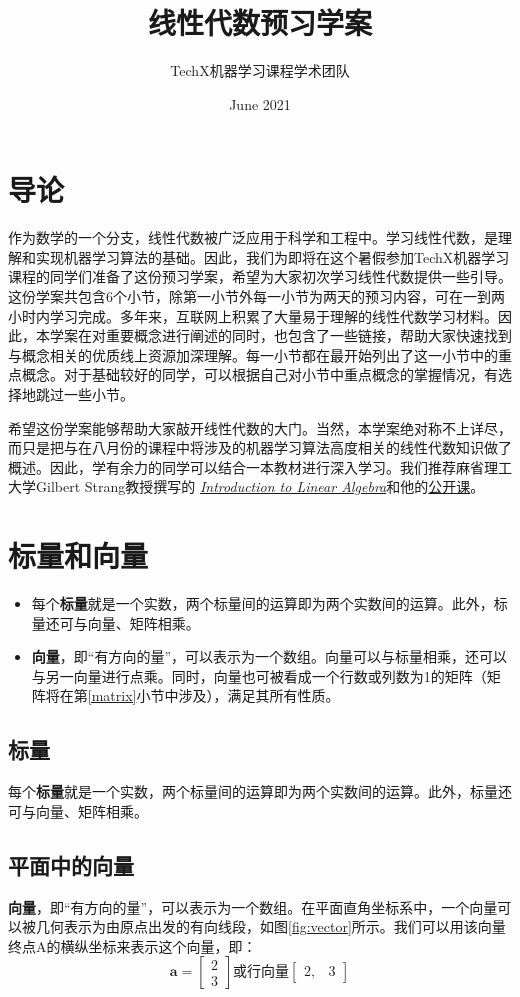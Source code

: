 \documentclass{ctexart}
\title{线性代数预习学案}
\author{TechX机器学习课程学术团队}
\date{June 2021}
\begin{document}
\maketitle

\section{导论}
作为数学的一个分支，线性代数被广泛应用于科学和工程中。学习线性代数，是理解和实现机器学习算法的基础。因此，我们为即将在这个暑假参加TechX机器学习课程的同学们准备了这份预习学案，希望为大家初次学习线性代数提供一些引导。这份学案共包含6个小节，除第一小节外每一小节为两天的预习内容，可在一到两小时内学习完成。多年来，互联网上积累了大量易于理解的线性代数学习材料。因此，本学案在对重要概念进行阐述的同时，也包含了一些链接，帮助大家快速找到与概念相关的优质线上资源加深理解。每一小节都在最开始列出了这一小节中的重点概念。对于基础较好的同学，可以根据自己对小节中重点概念的掌握情况，有选择地跳过一些小节。
\par
希望这份学案能够帮助大家敲开线性代数的大门。当然，本学案绝对称不上详尽，而只是把与在八月份的课程中将涉及的机器学习算法高度相关的线性代数知识做了概述。因此，学有余力的同学可以结合一本教材进行深入学习。我们推荐麻省理工大学Gilbert Strang教授撰写的
\href{http://math.mit.edu/~gs/linearalgebra/}{\textit{Introduction to Linear Algebra}}和他的\href{https://ocw.mit.edu/courses/mathematics/18-06-linear-algebra-spring-2010/}{公开课}。

\section{标量和向量}
\begin{itemize}
    \item 每个\textbf{标量}就是一个实数，两个标量间的运算即为两个实数间的运算。此外，标量还可与向量、矩阵相乘。
    \item \textbf{向量}，即“有方向的量”，可以表示为一个数组。向量可以与标量相乘，还可以与另一向量进行点乘。同时，向量也可被看成一个行数或列数为1的矩阵（矩阵将在第\ref{matrix}小节中涉及），满足其所有性质。
\end{itemize}
\subsection{标量}
每个\textbf{标量}就是一个实数，两个标量间的运算即为两个实数间的运算。此外，标量还可与向量、矩阵相乘。
\subsection{平面中的向量}
\textbf{向量}，即“有方向的量”，可以表示为一个数组。在平面直角坐标系中，一个向量可以被几何表示为由原点出发的有向线段，如图\ref{fig:vector}所示。我们可以用该向量终点A的横纵坐标来表示这个向量，即：
\[
\textbf{a}=
\begin{bmatrix}
2\\
3
\end{bmatrix}
或行向量 \begin{bmatrix}
2,& 3
\end{bmatrix}\]
\end{document}
